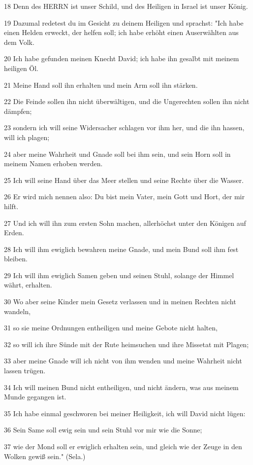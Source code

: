 \par 18 Denn des HERRN ist unser Schild, und des Heiligen in Israel ist unser König.
\par 19 Dazumal redetest du im Gesicht zu deinem Heiligen und sprachst: "Ich habe einen Helden erweckt, der helfen soll; ich habe erhöht einen Auserwählten aus dem Volk.
\par 20 Ich habe gefunden meinen Knecht David; ich habe ihn gesalbt mit meinem heiligen Öl.
\par 21 Meine Hand soll ihn erhalten und mein Arm soll ihn stärken.
\par 22 Die Feinde sollen ihn nicht überwältigen, und die Ungerechten sollen ihn nicht dämpfen;
\par 23 sondern ich will seine Widersacher schlagen vor ihm her, und die ihn hassen, will ich plagen;
\par 24 aber meine Wahrheit und Gnade soll bei ihm sein, und sein Horn soll in meinem Namen erhoben werden.
\par 25 Ich will seine Hand über das Meer stellen und seine Rechte über die Wasser.
\par 26 Er wird mich nennen also: Du bist mein Vater, mein Gott und Hort, der mir hilft.
\par 27 Und ich will ihn zum ersten Sohn machen, allerhöchst unter den Königen auf Erden.
\par 28 Ich will ihm ewiglich bewahren meine Gnade, und mein Bund soll ihm fest bleiben.
\par 29 Ich will ihm ewiglich Samen geben und seinen Stuhl, solange der Himmel währt, erhalten.
\par 30 Wo aber seine Kinder mein Gesetz verlassen und in meinen Rechten nicht wandeln,
\par 31 so sie meine Ordnungen entheiligen und meine Gebote nicht halten,
\par 32 so will ich ihre Sünde mit der Rute heimsuchen und ihre Missetat mit Plagen;
\par 33 aber meine Gnade will ich nicht von ihm wenden und meine Wahrheit nicht lassen trügen.
\par 34 Ich will meinen Bund nicht entheiligen, und nicht ändern, was aus meinem Munde gegangen ist.
\par 35 Ich habe einmal geschworen bei meiner Heiligkeit, ich will David nicht lügen:
\par 36 Sein Same soll ewig sein und sein Stuhl vor mir wie die Sonne;
\par 37 wie der Mond soll er ewiglich erhalten sein, und gleich wie der Zeuge in den Wolken gewiß sein." (Sela.)
